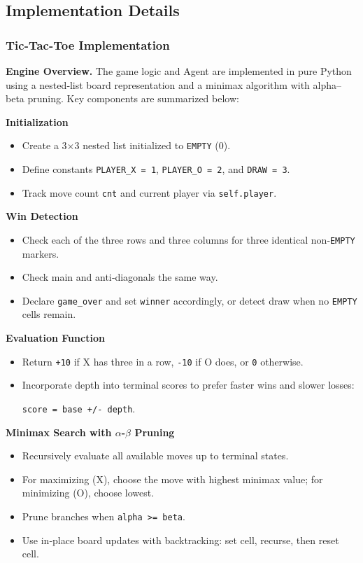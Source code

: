 \documentclass[12pt]{article}
\begin{document}
\subsection{Implementation Details}

\subsubsection{Tic-Tac-Toe Implementation}

\textbf{Engine Overview.}  
The game logic and Agent are implemented in pure Python using a nested‑list board representation and a minimax algorithm with alpha–beta pruning. Key components are summarized below:

\vspace{1em}

\noindent\textbf{Initialization}
\begin{itemize}
  \item Create a 3×3 nested list initialized to \texttt{EMPTY} (0).  
  \item Define constants \texttt{PLAYER\_X = 1}, \texttt{PLAYER\_O = 2}, and \texttt{DRAW = 3}.  
  \item Track move count \texttt{cnt} and current player via \texttt{self.player}.
\end{itemize}

\noindent\textbf{Win Detection}
\begin{itemize}
  \item Check each of the three rows and three columns for three identical non‑\texttt{EMPTY} markers.  
  \item Check main and anti‑diagonals the same way.  
  \item Declare \texttt{game\_over} and set \texttt{winner} accordingly, or detect draw when no \texttt{EMPTY} cells remain.
\end{itemize}

\noindent\textbf{Evaluation Function}
\begin{itemize}
  \item Return \texttt{+10} if X has three in a row, \texttt{-10} if O does, or \texttt{0} otherwise.  
  \item Incorporate depth into terminal scores to prefer faster wins and slower losses:
    \begin{center}
        \texttt{score = base +/- depth}.
    \end{center}
\end{itemize}

\noindent\textbf{Minimax Search with \(\alpha\)-\(\beta\) Pruning}
\begin{itemize}
  \item Recursively evaluate all available moves up to terminal states.  
  \item For maximizing (X), choose the move with highest minimax value; for minimizing (O), choose lowest.  
  \item Prune branches when \texttt{alpha >= beta}.  
  \item Use in‑place board updates with backtracking: set cell, recurse, then reset cell.
\end{itemize}
\end{document}
